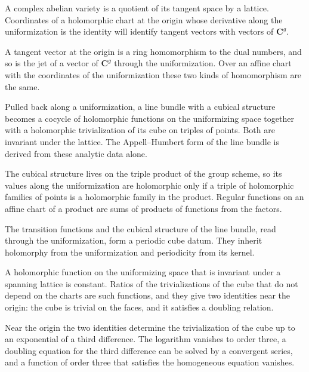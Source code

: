 A complex abelian variety is a quotient of its tangent space by a lattice. Coordinates of a holomorphic chart at the origin
whose derivative along the uniformization is the identity will identify tangent vectors with vectors of $\mathbf C^g$.

A tangent vector at the origin is a ring homomorphism to the dual numbers, and so is the jet of a vector of $\mathbf C^g$
through the uniformization. Over an affine chart with the coordinates of the uniformization these two kinds of
homomorphism are the same.

Pulled back along a uniformization, a line bundle with a cubical structure becomes a cocycle of holomorphic functions on the
uniformizing space together with a holomorphic trivialization of its cube on triples of points. Both are invariant under the
lattice. The Appell--Humbert form of the line bundle is derived from these analytic data alone.

The cubical structure lives on the triple product of the group scheme, so its values along the uniformization are holomorphic
only if a triple of holomorphic families of points is a holomorphic family in the product. Regular functions on an affine
chart of a product are sums of products of functions from the factors.

The transition functions and the cubical structure of the line bundle, read through the uniformization, form a periodic cube
datum. They inherit holomorphy from the uniformization and periodicity from its kernel.

A holomorphic function on the uniformizing space that is invariant under a spanning lattice is constant. Ratios of the
trivializations of the cube that do not depend on the charts are such functions, and they give two identities near the
origin: the cube is trivial on the faces, and it satisfies a doubling relation.

Near the origin the two identities determine the trivialization of the cube up to an exponential of a third difference. The
logarithm vanishes to order three, a doubling equation for the third difference can be solved by a convergent series, and a
function of order three that satisfies the homogeneous equation vanishes.

